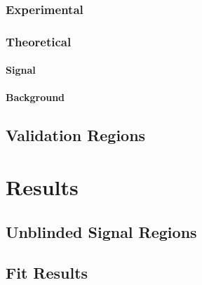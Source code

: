 \subsection{Experimental}
\label{sec:sys_experimental}
\subsection{Theoretical}
\subsubsection{Signal}
\subsubsection{Background}
\label{sec:sys_theorybkg}

\section{Validation Regions}


\chapter{Results}
\section{Unblinded Signal Regions}


\section{Fit Results}

